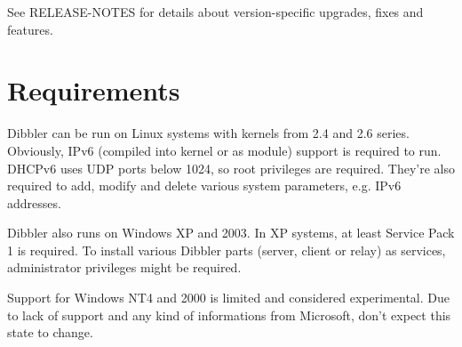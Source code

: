 See RELEASE-NOTES for details about version-specific upgrades, fixes
and features.

\section{Requirements}
Dibbler can be run on Linux systems with kernels from 2.4 and 2.6
series. Obviously, IPv6 (compiled into kernel or as module) support is
required to run. DHCPv6 uses UDP ports below 1024, so root privileges
are required. They're also required to add, modify and delete various
system parameters, e.g. IPv6 addresses.

Dibbler also runs on Windows XP and 2003. In XP systems, at least
Service Pack 1 is required. To install various Dibbler parts (server,
client or relay) as services, administrator privileges might be
required. 

Support for Windows NT4 and 2000 is limited and considered
experimental. Due to lack of support and any kind of informations from
Microsoft, don't expect this state to change.